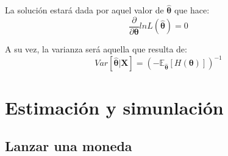 \documentclass[
]{book}
\begin{document}
La solución estará dada por aquel valor de \(\hat{\boldsymbol{\theta}}\) que hace:
\begin{equation*}
    \frac{\partial}{\partial \boldsymbol{\theta}} ln L(\hat{\boldsymbol{\theta}}) = 0
\end{equation*}

A su vez, la varianza será aquella que resulta de:
\begin{equation*}
    Var[\hat{\boldsymbol{\theta}} | \mathbf{X}] = \left( - \mathbb{E}_{\hat{\boldsymbol{\theta}}}[H(\boldsymbol{\theta})] \right)^{-1}
\end{equation*}

\hypertarget{estimaciuxf3n-y-simunlaciuxf3n}{%
\section{Estimación y simunlación}\label{estimaciuxf3n-y-simunlaciuxf3n}}

\hypertarget{lanzar-una-moneda}{%
\subsection{Lanzar una moneda}\label{lanzar-una-moneda}}
\end{document}
